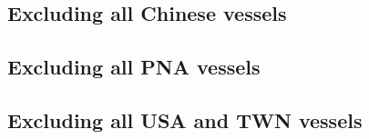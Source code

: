 \documentclass[9p,twocolumn,twoside,lineno]{pnas-new}
\begin{document}
\subsection{Excluding all Chinese vessels}



\subsection{Excluding all PNA vessels}




\subsection{Excluding all USA and TWN vessels}







 



\end{document}
